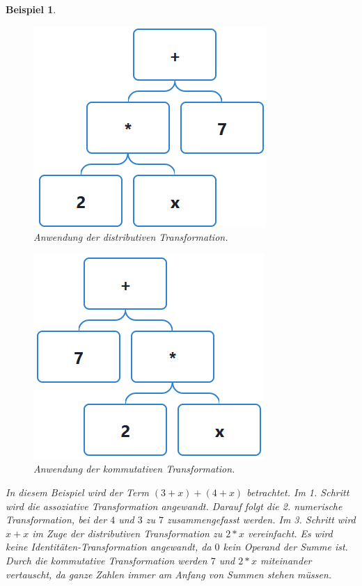 \documentclass[11pt]{article}
\newtheorem{example}{Beispiel}
\begin{document}
\begin{example}
\begin{figure}[h]
\begin{minipage}{.5\textwidth}
    \end{minipage}
    \begin{minipage}{.5\textwidth}
      \centering
      \includegraphics[scale=0.45]{trees/sum/beispiel_1_4.png}
      \caption{Anwendung der distributiven Transformation.}
    \end{minipage}
  \end{figure}
  \begin{figure}[h!]
    \centering
    \includegraphics*[scale=0.5]{trees/sum/beispiel_1_5.png}
    \caption{Anwendung der kommutativen Transformation.}
  \end{figure}
  In diesem Beispiel wird der Term $(3+x)+(4+x)$ betrachtet. Im 1. Schritt wird die assoziative Transformation angewandt.
  Darauf folgt die 2. numerische Transformation, bei der $4$ und $3$ zu $7$ zusammengefasst werden. 
  Im 3. Schritt wird $x+x$ im Zuge der distributiven Transformation zu $2*x$ vereinfacht.
  Es wird keine Identitäten-Transformation angewandt, da $0$ kein Operand der Summe ist.
  Durch die kommutative Transformation werden $7$ und $2*x$ miteinander vertauscht, da ganze Zahlen immer am 
  Anfang von Summen stehen müssen.
\end{example}
\end{document}
